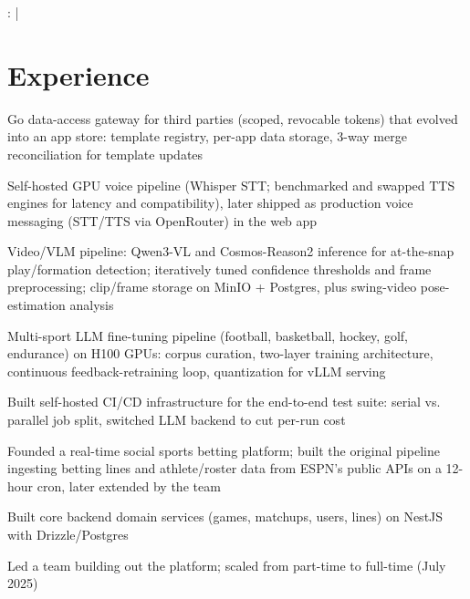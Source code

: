 \documentclass[]{jack-resume}
\begin{document}
\raggedright{
    :
      \href{https://www.linkedin.com/in/jack-sturtevant/}{ \ExternalLink} |
     \href{https://github.com/jacksturt}{ \ExternalLink}}


\section{Experience}

\begin{tightemize}
    \item Go data-access gateway for third parties (scoped, revocable tokens) that evolved into an app store: template registry, per-app data storage, 3-way merge reconciliation for template updates
    \item Self-hosted GPU voice pipeline (Whisper STT; benchmarked and swapped TTS engines for latency and compatibility), later shipped as production voice messaging (STT/TTS via OpenRouter) in the web app
    \item Video/VLM pipeline: Qwen3-VL and Cosmos-Reason2 inference for at-the-snap play/formation detection; iteratively tuned confidence thresholds and frame preprocessing; clip/frame storage on MinIO + Postgres, plus swing-video pose-estimation analysis
    \item Multi-sport LLM fine-tuning pipeline (football, basketball, hockey, golf, endurance) on H100 GPUs: corpus curation, two-layer training architecture, continuous feedback-retraining loop, quantization for vLLM serving
    \item Built self-hosted CI/CD infrastructure for the end-to-end test suite: serial vs. parallel job split, switched LLM backend to cut per-run cost
\end{tightemize}
\sectionsep

\begin{tightemize}
    \item Founded a real-time social sports betting platform; built the original pipeline ingesting betting lines and athlete/roster data from ESPN's public APIs on a 12-hour cron, later extended by the team
    \item Built core backend domain services (games, matchups, users, lines) on NestJS with Drizzle/Postgres
    \item Led a team building out the platform; scaled from part-time to full-time (July 2025)
\end{tightemize}
\sectionsep
\end{document}

